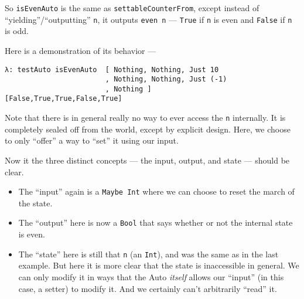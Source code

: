 \documentclass[]{article}
\newenvironment{Shaded}{}{}
\newcommand{\KeywordTok}[1]{\textcolor[rgb]{0.00,0.44,0.13}{\textbf{{#1}}}}
\newcommand{\DataTypeTok}[1]{\textcolor[rgb]{0.56,0.13,0.00}{{#1}}}
\newcommand{\DecValTok}[1]{\textcolor[rgb]{0.25,0.63,0.44}{{#1}}}
\newcommand{\OtherTok}[1]{\textcolor[rgb]{0.00,0.44,0.13}{{#1}}}
\newcommand{\FunctionTok}[1]{\textcolor[rgb]{0.02,0.16,0.49}{{#1}}}
\newcommand{\NormalTok}[1]{{#1}}
\begin{document}
\begin{Shaded}
\end{Shaded}

So \texttt{isEvenAuto} is the same as \texttt{settableCounterFrom}, except instead of
``yielding''/``outputting'' \texttt{n}, it outputs \texttt{even\ n} --- \texttt{True} if \texttt{n}
is even and \texttt{False} if \texttt{n} is odd.

Here is a demonstration of its behavior ---

\begin{verbatim}
λ: testAuto isEvenAuto  [ Nothing, Nothing, Just 10
                        , Nothing, Nothing, Just (-1)
                        , Nothing ]
[False,True,True,False,True]
\end{verbatim}

Note that there is in general really no way to ever access the \texttt{n} internally. It is
completely sealed off from the world, except by explicit design. Here, we choose to only ``offer'' a
way to ``set'' it using our input.

Now it the three distinct concepts --- the input, output, and state --- should be clear.

\begin{itemize}
\tightlist
\item
  The ``input'' again is a \texttt{Maybe\ Int} where we can choose to reset the march of the state.
\item
  The ``output'' here is now a \texttt{Bool} that says whether or not the internal state is even.
\item
  The ``state'' here is still that \texttt{n} (an \texttt{Int}), and was the same as in the last
  example. But here it is more clear that the state is inaccessible in general. We can only modify
  it in ways that the Auto \emph{itself} allows our ``input'' (in this case, a setter) to modify it.
  And we certainly can't arbitrarily ``read'' it.
\end{itemize}
\end{document}
